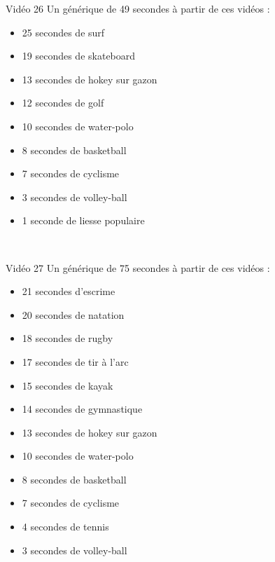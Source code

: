 \documentclass[10pt, a5paper,twoside]{article}
\begin{document}
\begin{card}[width = \textwidth, colback = olympicyellow, colframe = olympicyellow, bottomtitle = 2mm]{Vidéo 26}
  Un générique de 49 secondes à partir de ces vidéos :
  \vspace{-1mm}\begin{itemize}
    \item 25 secondes de surf
    \item 19 secondes de skateboard
    \item 13 secondes de hokey sur gazon
    \item 12 secondes de golf
    \item 10 secondes de water-polo
    \item 8 secondes de basketball
    \item 7 secondes de cyclisme
    \item 3 secondes de volley-ball
    \item 1 seconde de liesse populaire
  \end{itemize}
\end{card}

\vfill

\clearpage
~
\vfill

\begin{card}[width = \textwidth, colback = olympicyellow, colframe = olympicyellow, bottomtitle = 2mm]{Vidéo 27}
  Un générique de 75 secondes à partir de ces vidéos :
  \vspace{-1mm}\begin{itemize}
    \item 21 secondes d'escrime
    \item 20 secondes de natation
    \item 18 secondes de rugby
    \item 17 secondes de tir à l'arc
    \item 15 secondes de kayak
    \item 14 secondes de gymnastique
    \item 13 secondes de hokey sur gazon
    \item 10 secondes de water-polo
    \item 8 secondes de basketball
    \item 7 secondes de cyclisme
    \item 4 secondes de tennis
    \item 3 secondes de volley-ball
  \end{itemize}
\end{card}
\end{document}
